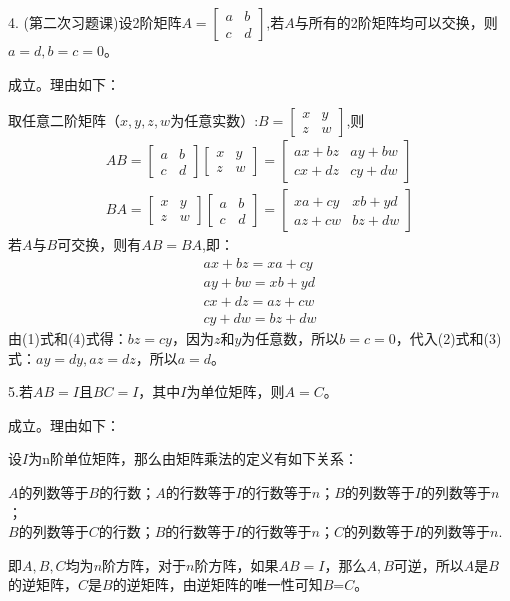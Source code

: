 \documentclass{article}
\begin{document}
4. \textcolor[rgb]{0.50,0.00,0.00}{(第二次习题课)}设2阶矩阵$A=
\begin{bmatrix}
  a & b \\
  c & d
\end{bmatrix}
$,若$A$与所有的2阶矩阵均可以交换，则$a=d,b=c=0$。

\begin{jie}
成立。理由如下：

取任意二阶矩阵（$x,y,z,w$为任意实数）:$
B=
\begin{bmatrix}
  x & y \\
  z & w
\end{bmatrix}
$,则
\begin{gather*}
AB=\begin{bmatrix}
  a & b \\
  c & d
\end{bmatrix}
\begin{bmatrix}
  x & y \\
  z & w
\end{bmatrix}=
\begin{bmatrix}
  ax+bz & ay+bw \\
  cx+dz & cy+dw
\end{bmatrix}\\
BA=
\begin{bmatrix}
  x & y \\
  z & w
\end{bmatrix}
\begin{bmatrix}
  a & b \\
  c & d
\end{bmatrix}=
\begin{bmatrix}
  xa+cy & xb+yd \\
  az+cw & bz+dw
\end{bmatrix}
\end{gather*}
若$A$与$B$可交换，则有$AB=BA$,即：
\begin{gather}
ax+bz=xa+cy  \\
ay+bw=xb+yd\\
cx+dz=az+cw\\
cy+dw=bz+dw
\end{gather}
由(1)式和(4)式得：$bz=cy$，因为$z$和$y$为任意数，所以$b=c=0$，代入(2)式和(3)式：$ay=dy,az=dz$，所以$a=d$。
\end{jie}

5.若$AB=I$且$BC=I$，其中$I$为单位矩阵，则$A=C$。

\begin{jie}
成立。理由如下：

设$I$为n阶单位矩阵，那么由矩阵乘法的定义有如下关系：

$A$的列数等于$B$的行数；$A$的行数等于$I$的行数等于$n$；$B$的列数等于$I$的列数等于$n$；\\
$B$的列数等于$C$的行数；$B$的行数等于$I$的行数等于$n$；$C$的列数等于$I$的列数等于$n$.

即$A,B,C$均为$n$阶方阵，对于$n$阶方阵，如果$AB=I$，那么$A,B$可逆，所以$A$是$B$的逆矩阵，$C$是$B$的逆矩阵，由逆矩阵的唯一性可知$B$=$C$。
\end{jie}
\end{document}
